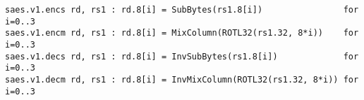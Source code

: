 

\begin{lstlisting}[language=pseudo,style=block]
saes.v1.encs rd, rs1 : rd.8[i] = SubBytes(rs1.8[i])                for i=0..3
saes.v1.encm rd, rs1 : rd.8[i] = MixColumn(ROTL32(rs1.32, 8*i))    for i=0..3
saes.v1.decs rd, rs1 : rd.8[i] = InvSubBytes(rs1.8[i])             for i=0..3
saes.v1.decm rd, rs1 : rd.8[i] = InvMixColumn(ROTL32(rs1.32, 8*i)) for i=0..3
\end{lstlisting}


